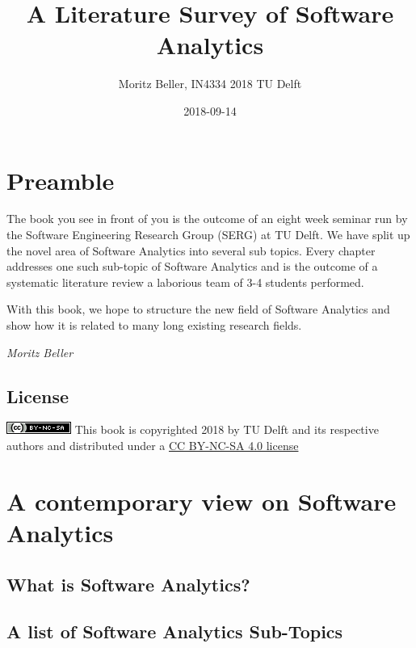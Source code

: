 \documentclass[]{book}
\title{A Literature Survey of Software Analytics}
\author{Moritz Beller, IN4334 2018 TU Delft}
\date{2018-09-14}
\begin{document}
\maketitle

{
\setcounter{tocdepth}{1}
\tableofcontents
}
\chapter{Preamble}\label{intro}

The book you see in front of you is the outcome of an eight week seminar
run by the Software Engineering Research Group (SERG) at TU Delft. We
have split up the novel area of Software Analytics into several sub
topics. Every chapter addresses one such sub-topic of Software Analytics
and is the outcome of a systematic literature review a laborious team of
3-4 students performed.

With this book, we hope to structure the new field of Software Analytics
and show how it is related to many long existing research fields.

\emph{Moritz Beller}

\section{License}\label{license}

\includegraphics{figures/cc-nc-sa.png} This book is copyrighted 2018 by
TU Delft and its respective authors and distributed under a
\href{https://creativecommons.org/licenses/by-nc-sa/4.0/}{CC BY-NC-SA
4.0 license}

\chapter{A contemporary view on Software
Analytics}\label{a-contemporary-view-on-software-analytics}

\section{What is Software Analytics?}\label{what-is-software-analytics}

\section{A list of Software Analytics
Sub-Topics}\label{a-list-of-software-analytics-sub-topics}
\end{document}
